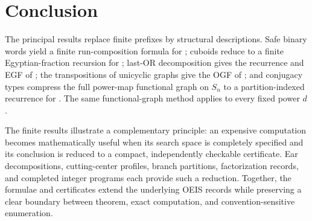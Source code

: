 \section{Conclusion}

The principal results replace finite prefixes by structural descriptions.
Safe binary words yield a finite run-composition formula for ;
cuboids reduce to a finite
Egyptian-fraction recursion for ; last-OR decomposition gives the
recurrence and EGF of ; the transpositions of unicyclic graphs give
the OGF of ; and conjugacy types compress the full power-map
functional graph on \(S_n\) to a partition-indexed recurrence for
.  The same functional-graph method applies to every fixed power
\(d\).

The finite results illustrate a complementary principle: an expensive
computation becomes mathematically useful when its search space is completely
specified and its conclusion is reduced to a compact, independently checkable
certificate.  Ear decompositions, cutting-center profiles, branch partitions,
factorization records, and completed integer programs each provide such a
reduction.  Together, the formulae and certificates extend the underlying
OEIS records while preserving a clear boundary between theorem, exact
computation, and convention-sensitive enumeration.
